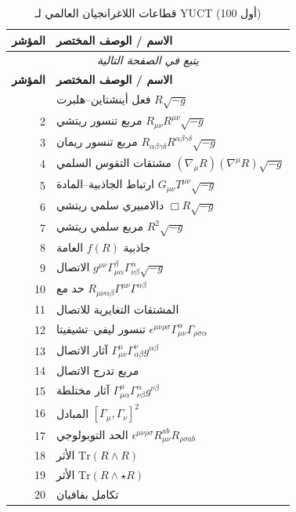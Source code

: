 \documentclass[11pt,a4paper]{article}
\begin{document}
	\begin{longtable}{r l}
		\caption{قطاعات اللاغرانجيان العالمي لـ YUCT (أول 100)}\label{tab:sectors}\\
		\toprule
		\textbf{المؤشر} & \textbf{الاسم / الوصف المختصر} \\
		\midrule
		\endfirsthead
		\multicolumn{2}{c}{\textit{يتبع في الصفحة التالية}}\\
		\toprule
		\textbf{المؤشر} & \textbf{الاسم / الوصف المختصر} \\
		\midrule
		\endhead
		\bottomrule
		\endfoot
		1 & فعل أينشتاين–هلبرت \(R\sqrt{-g}\) \\
		2 & مربع تنسور ريتشي \(R_{\mu\nu}R^{\mu\nu}\sqrt{-g}\) \\
		3 & مربع تنسور ريمان \(R_{\alpha\beta\gamma\delta}R^{\alpha\beta\gamma\delta}\sqrt{-g}\) \\
		4 & مشتقات التقوس السلمي \((\nabla_\mu R)(\nabla^\mu R)\sqrt{-g}\) \\
		5 & ارتباط الجاذبية–المادة \(G_{\mu\nu}T^{\mu\nu}\sqrt{-g}\) \\
		6 & دالامبيري سلمي ريتشي \(\Box R\sqrt{-g}\) \\
		7 & مربع سلمي ريتشي \(R^2\sqrt{-g}\) \\
		8 & جاذبية \(f(R)\) العامة \\
		9 & الاتصال \(g^{\mu\nu}\Gamma^{\beta}_{\mu\alpha}\Gamma^{\alpha}_{\nu\beta}\sqrt{-g}\) \\
		10 & حد مع \(R_{\mu\nu\alpha\beta}\Gamma^{\mu\nu}\Gamma^{\alpha\beta}\) \\
		11 & المشتقات التغايرية للاتصال \\
		12 & تنسور ليفي–تشيفيتا \(\epsilon^{\mu\nu\rho\sigma}\Gamma^{\alpha}_{\mu\nu}\Gamma_{\rho\sigma\alpha}\) \\
		13 & آثار الاتصال \(\Gamma^{\mu}_{\mu\nu}\Gamma^{\nu}_{\alpha\beta}g^{\alpha\beta}\) \\
		14 & مربع تدرج الاتصال \\
		15 & آثار مختلطة \(\Gamma^{\mu}_{\mu\alpha}\Gamma^{\alpha}_{\nu\beta}g^{\nu\beta}\) \\
		16 & المبادل \([\Gamma_\mu, \Gamma_\nu]^2\) \\
		17 & الحد التوبولوجي \(\epsilon^{\mu\nu\rho\sigma}R_{\mu\nu}^{ab}R_{\rho\sigma ab}\) \\
		18 & الأثر \(\mathrm{Tr}(R\wedge R)\) \\
		19 & الأثر \(\mathrm{Tr}(R\wedge\star R)\) \\
		20 & تكامل بفافيان \\

\end{longtable}
\end{document}
